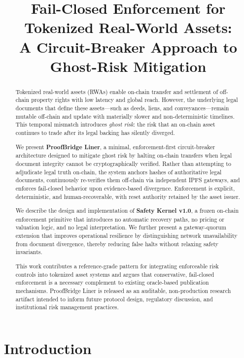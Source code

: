 \documentclass[10pt,conference]{IEEEtran}
\title{Fail-Closed Enforcement for Tokenized Real-World Assets:\\A Circuit-Breaker Approach to Ghost-Risk Mitigation}
\author{
\IEEEauthorblockN{ProofBridge Liner Development Team}
\IEEEauthorblockA{Anonymous for Review}
}
\begin{document}
\maketitle

\begin{abstract}
Tokenized real-world assets (RWAs) enable on-chain transfer and settlement of off-chain property rights with low latency and global reach. However, the underlying legal documents that define these assets—such as deeds, liens, and conveyances—remain mutable off-chain and update with materially slower and non-deterministic timelines. This temporal mismatch introduces \textit{ghost risk}: the risk that an on-chain asset continues to trade after its legal backing has silently diverged.

We present \textbf{ProofBridge Liner}, a minimal, enforcement-first circuit-breaker architecture designed to mitigate ghost risk by halting on-chain transfers when legal document integrity cannot be cryptographically verified. Rather than attempting to adjudicate legal truth on-chain, the system anchors hashes of authoritative legal documents, continuously re-verifies them off-chain via independent IPFS gateways, and enforces fail-closed behavior upon evidence-based divergence. Enforcement is explicit, deterministic, and human-recoverable, with reset authority retained by the asset issuer.

We describe the design and implementation of \textbf{Safety Kernel v1.0}, a frozen on-chain enforcement primitive that introduces no automatic recovery paths, no pricing or valuation logic, and no legal interpretation. We further present a gateway-quorum extension that improves operational resilience by distinguishing network unavailability from document divergence, thereby reducing false halts without relaxing safety invariants.

This work contributes a reference-grade pattern for integrating enforceable risk controls into tokenized asset systems and argues that conservative, fail-closed enforcement is a necessary complement to existing oracle-based publication mechanisms. ProofBridge Liner is released as an auditable, non-production research artifact intended to inform future protocol design, regulatory discussion, and institutional risk management practices.
\end{abstract}

\section{Introduction}
\label{sec:introduction}
\end{document}
